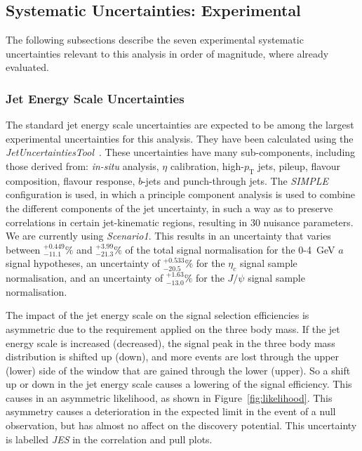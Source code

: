 \documentclass[NOTE, atlasdraft=true, texlive=2017, UKenglish]{\ATLASLATEXPATH atlasdoc}
\begin{document}
\subsection{Systematic Uncertainties: Experimental}
\label{sec:systematicsexperiment}

The following subsections describe the seven experimental systematic uncertainties relevant to this analysis in order of magnitude, where already evaluated.


\subsubsection{Jet Energy Scale Uncertainties}
\label{sec:sysjet}

The standard jet energy scale uncertainties are expected to be among the largest experimental uncertainties for this analysis. They have been calculated using the \emph{JetUncertaintiesTool}~\cite{JetUncertaintiesTool}. These uncertainties have many sub-components, including those derived from: \emph{in-situ} analysis, $\eta$ calibration, high-$p_\text{T}$ jets, pileup, flavour composition, flavour response, $b$-jets and punch-through jets. The \emph{SIMPLE} configuration is used, in which a principle component analysis is used to combine the different components of the jet uncertainty, in such a way as to preserve correlations in certain jet-kinematic regions, resulting in 30 nuisance parameters. We are currently using \emph{Scenario1}. This results in an uncertainty that varies between $^{+0.449}_{-11.1}\%$ and $^{+3.99}_{-21.3}\%$ of the total signal normalisation for the 0-4~GeV $a$ signal hypotheses, an uncertainty of $^{+0.533}_{-20.5}\%$ for the $\eta_c$ signal sample normalisation, and an uncertainty of $^{+1.63}_{-13.0}\%$ for the $J/\psi$ signal sample normalisation.

The impact of the jet energy scale on the signal selection efficiencies is asymmetric due to the requirement applied on the three body mass. If the jet energy scale is increased (decreased), the signal peak in the three body mass distribution is shifted up (down), and more events are lost through the upper (lower) side of the window that are gained through the lower (upper). So a shift up or down in the jet energy scale causes a lowering of the signal efficiency. This causes in an asymmetric likelihood, as shown in Figure~\ref{fig:likelihood}. This asymmetry causes a deterioration in the expected limit in the event of a null observation, but has almost no affect on the discovery potential. This uncertainty is labelled \emph{JES} in the correlation and pull plots.
\end{document}
